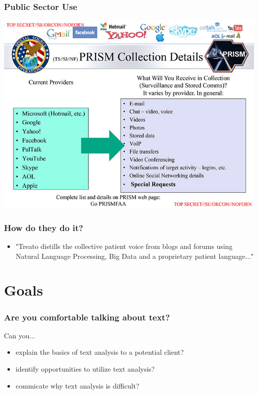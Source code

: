 \documentclass[presentation]{beamer}
\begin{document}
\begin{frame}
\frametitle{Public Sector Use}
\pause
\begin{center}
\includegraphics[height=.9\textheight]{Images/PRISM.jpg}
\end{center}
\end{frame}


\begin{frame}
\frametitle{How do they do it?}
\begin{itemize}
\pause
\item  "Treato distills the collective patient voice from blogs and forums using Natural Language Processing, Big Data and a proprietary patient language..."
\end{itemize}
\end{frame}

\section{Goals}


\begin{frame}
\frametitle{Are you comfortable talking about text?}
\pause
\begin{block}{Can you...}
\begin{itemize}
\pause
\item explain the basics of text analysis to a potential client?
\pause
\item identify opportunities to utilize text analysis?
\pause
\item commicate why text analysis is difficult?
\end{itemize}
\end{block}
\end{frame}
\end{document}
